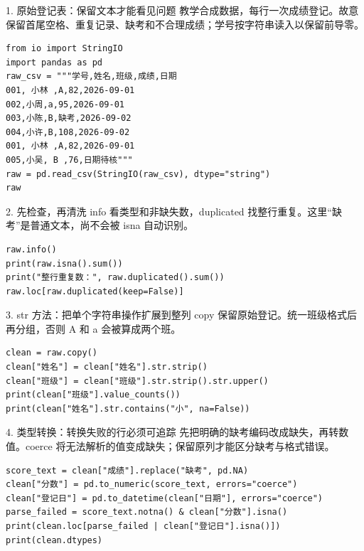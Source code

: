 \begin{frame}[fragile]{1. 原始登记表：保留文本才能看见问题}
\small 教学合成数据，每行一次成绩登记。故意保留首尾空格、重复记录、缺考和不合理成绩；学号按字符串读入以保留前导零。
\medskip
\begin{lstlisting}
from io import StringIO
import pandas as pd
raw_csv = """学号,姓名,班级,成绩,日期
001, 小林 ,A,82,2026-09-01
002,小周,a,95,2026-09-01
003,小陈,B,缺考,2026-09-02
004,小许,B,108,2026-09-02
001, 小林 ,A,82,2026-09-01
005,小吴, B ,76,日期待核"""
raw = pd.read_csv(StringIO(raw_csv), dtype="string")
raw
\end{lstlisting}
\end{frame}

\begin{frame}[fragile]{2. 先检查，再清洗}
\small info 看类型和非缺失数，duplicated 找整行重复。这里“缺考”是普通文本，尚不会被 isna 自动识别。
\medskip
\begin{lstlisting}
raw.info()
print(raw.isna().sum())
print("整行重复数：", raw.duplicated().sum())
raw.loc[raw.duplicated(keep=False)]
\end{lstlisting}
\end{frame}

\begin{frame}[fragile]{3. str 方法：把单个字符串操作扩展到整列}
\small copy 保留原始登记。统一班级格式后再分组，否则 A 和 a 会被算成两个班。
\medskip
\begin{lstlisting}
clean = raw.copy()
clean["姓名"] = clean["姓名"].str.strip()
clean["班级"] = clean["班级"].str.strip().str.upper()
print(clean["班级"].value_counts())
print(clean["姓名"].str.contains("小", na=False))
\end{lstlisting}
\end{frame}

\begin{frame}[fragile]{4. 类型转换：转换失败的行必须可追踪}
\small 先把明确的缺考编码改成缺失，再转数值。coerce 将无法解析的值变成缺失；保留原列才能区分缺考与格式错误。
\medskip
\begin{lstlisting}
score_text = clean["成绩"].replace("缺考", pd.NA)
clean["分数"] = pd.to_numeric(score_text, errors="coerce")
clean["登记日"] = pd.to_datetime(clean["日期"], errors="coerce")
parse_failed = score_text.notna() & clean["分数"].isna()
print(clean.loc[parse_failed | clean["登记日"].isna()])
print(clean.dtypes)
\end{lstlisting}
\end{frame}

